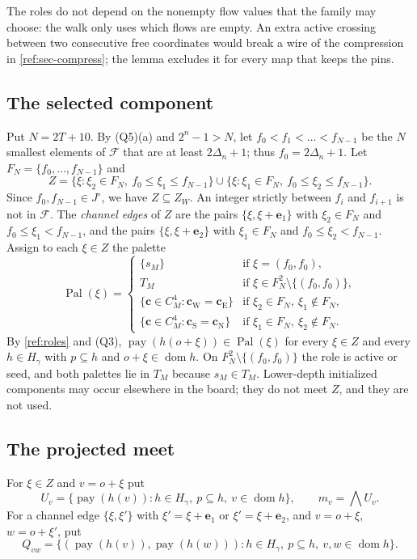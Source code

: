 The roles do not depend on the nonempty flow values that the family may choose: the walk only uses which flows are empty. An extra active crossing between two consecutive free coordinates would break a wire of the compression in \cref{ref:sec-compress}; the lemma excludes it for every map that keeps the pins.

\subsection{The selected component}\label{ref:sec-select}

Put $N=2T+10$. By (Q5)(a) and $2^n-1>N$, let $f_0<f_1<\dots<f_{N-1}$ be the $N$ smallest elements of $\mathcal F$ that are at least $2\Delta_n+1$; thus $f_0=2\Delta_n+1$. Let $F_N=\{f_0,\dots,f_{N-1}\}$ and
\[
Z=\bigl\{\xi:\xi_2\in F_N,\ f_0\le\xi_1\le f_{N-1}\bigr\}\cup\bigl\{\xi:\xi_1\in F_N,\ f_0\le\xi_2\le f_{N-1}\bigr\}.
\]
Since $f_0,f_{N-1}\in J^\circ$, we have $Z\subseteq Z_W$. An integer strictly between $f_i$ and $f_{i+1}$ is not in $\mathcal F$. The \emph{channel edges} of $Z$ are the pairs $\{\xi,\xi+\mathbf e_1\}$ with $\xi_2\in F_N$ and $f_0\le\xi_1<f_{N-1}$, and the pairs $\{\xi,\xi+\mathbf e_2\}$ with $\xi_1\in F_N$ and $f_0\le\xi_2<f_{N-1}$. Assign to each $\xi\in Z$ the palette
\[
\operatorname{Pal}(\xi)=\begin{cases}
\{s_M\}&\text{if }\xi=(f_0,f_0),\\
T_M&\text{if }\xi\in F_N^2\setminus\{(f_0,f_0)\},\\
\{\mathbf c\in C_M^4:\mathbf c_{\mathrm W}=\mathbf c_{\mathrm E}\}&\text{if }\xi_2\in F_N,\ \xi_1\notin F_N,\\
\{\mathbf c\in C_M^4:\mathbf c_{\mathrm S}=\mathbf c_{\mathrm N}\}&\text{if }\xi_1\in F_N,\ \xi_2\notin F_N.
\end{cases}
\]
By \cref{ref:roles} and (Q3), $\operatorname{pay}(h(o+\xi))\in\operatorname{Pal}(\xi)$ for every $\xi\in Z$ and every $h\in H_\gamma$ with $p\subseteq h$ and $o+\xi\in\operatorname{dom}h$. On $F_N^2\setminus\{(f_0,f_0)\}$ the role is active or seed, and both palettes lie in $T_M$ because $s_M\in T_M$. Lower-depth initialized components may occur elsewhere in the board; they do not meet $Z$, and they are not used.

\subsection{The projected meet}\label{ref:sec-meet}

For $\xi\in Z$ and $v=o+\xi$ put
\[
U_v=\bigl\{\operatorname{pay}(h(v)):h\in H_\gamma,\ p\subseteq h,\ v\in\operatorname{dom}h\bigr\},\qquad m_v=\textstyle\bigwedge U_v .
\]
For a channel edge $\{\xi,\xi'\}$ with $\xi'=\xi+\mathbf e_1$ or $\xi'=\xi+\mathbf e_2$, and $v=o+\xi$, $w=o+\xi'$, put
\[
Q_{vw}=\bigl\{(\operatorname{pay}(h(v)),\operatorname{pay}(h(w))):h\in H_\gamma,\ p\subseteq h,\ v,w\in\operatorname{dom}h\bigr\}.
\]

